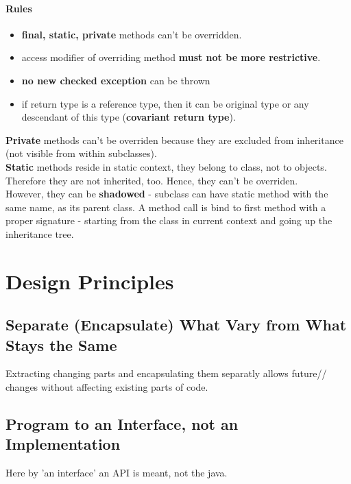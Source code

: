 \documentclass{report}
\begin{document}
\subsection*{Rules}
\begin{itemize}
	\item \textbf{final, static, private} methods can't be overridden.
	\item access modifier of overriding method \textbf{must not be more restrictive}.
	\item \textbf{no new checked exception} can be thrown
	\item if return type is a reference type, then it can be original type or any descendant of this type (\textbf{covariant return type}).
\end{itemize}

\textbf{Private} methods can't be overriden because they are excluded from inheritance (not visible from within subclasses). \\
\textbf{Static} methods reside in static context, they belong to class, not to objects. Therefore they are not inherited, too. Hence, they can't be overriden. \\
However, they can be \textbf{shadowed} - subclass can have static method with the same name, as its parent class. A method call is bind to first method with a proper signature - starting 
from the class in current context and going up the inheritance tree.




\part{Design Principles}



\chapter{Separate (Encapsulate) What Vary from What Stays the Same}
Extracting changing parts and encapsulating them separatly allows future//
changes without affecting existing parts of code.



\chapter{Program to an Interface, not an Implementation}
Here by 'an interface' an API is meant, not the java.
\end{document}
